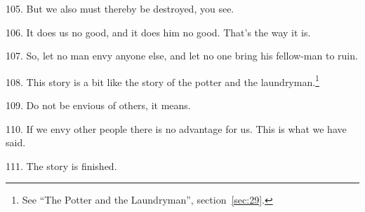 105. But we also must thereby be destroyed, you see.

106. It does us no good, and it does him no good. That's the way it is.

107. So, let no man envy anyone else, and let no one bring his fellow-man to ruin.

108. This story is a bit like the story of the potter and the laundryman.\footnote{See ``The Potter and the Laundryman'', section~\ref{sec:29}.}

109. Do not be envious of others, it means.

110. If we envy other people there is no advantage for us. This is what we have
said.

111. The story is finished.

